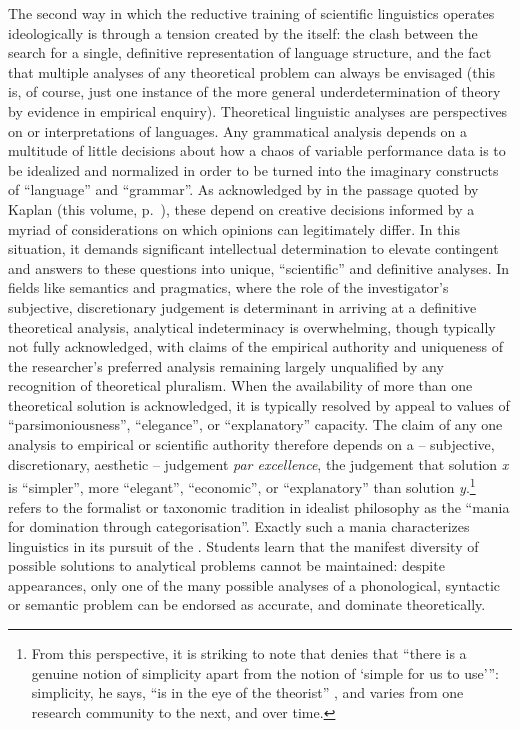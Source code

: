 \documentclass[output=paper]{langscibook}
\begin{document}
The second way in which the reductive training of scientific linguistics operates ideologically is through a tension created by the  itself: the clash between the search for a single, definitive representation of language structure, and the fact that multiple analyses of any theoretical problem can always be envisaged (this is, of course, just one instance of the more general underdetermination of theory by evidence in empirical enquiry). Theoretical linguistic analyses are perspectives on or interpretations of languages. Any grammatical analysis depends on a multitude of little decisions about how a chaos of variable performance data is to be idealized and normalized in order to be turned into the imaginary constructs of ``language'' and ``grammar''. As acknowledged by \citet[147]{Hockett1958} in the passage quoted by Kaplan (this volume, p.~\pageref{kaplan:hockettquote}), these depend on creative decisions informed by a myriad of considerations on which opinions can legitimately differ. In this situation, it demands significant intellectual determination to elevate contingent and  answers to these questions into unique, ``scientific'' and definitive analyses. In fields like semantics and pragmatics, where the role of the investigator's subjective, discretionary judgement is determinant in arriving at a definitive theoretical analysis, analytical indeterminacy is overwhelming, though typically not fully acknowledged, with claims of the empirical authority and uniqueness of the researcher's preferred analysis remaining largely unqualified by any recognition of theoretical pluralism. When the availability of more than one theoretical solution is acknowledged, it is typically resolved by appeal to values of ``parsimoniousness'', ``elegance'', or ``explanatory'' capacity. The claim of any one analysis to empirical or scientific authority therefore depends on a  -- subjective, discretionary, aesthetic -- judgement \emph{par excellence}, the judgement that solution \emph{x} is ``simpler'', more ``elegant'', ``economic'', or ``explanatory'' than solution \emph{y}.\footnote{From this perspective, it is striking to note that \citet[159]{Ludlow2011} denies that ``there is a genuine notion of simplicity apart from the notion of `simple for us to use'\thinspace'': simplicity, he says, ``is in the eye of the theorist'' \citep[161]{Ludlow2011}, and varies from one research community to the next, and over time.} \citet[105]{Althusser2015} refers to the formalist or taxonomic tradition in idealist philosophy as the ``mania for domination through categorisation''. Exactly such a mania characterizes linguistics in its pursuit of the . Students learn that the manifest diversity of possible solutions to analytical problems cannot be maintained: despite appearances, only one of the many possible analyses of a phonological, syntactic or semantic problem can be endorsed as accurate, and dominate theoretically.
\end{document}
